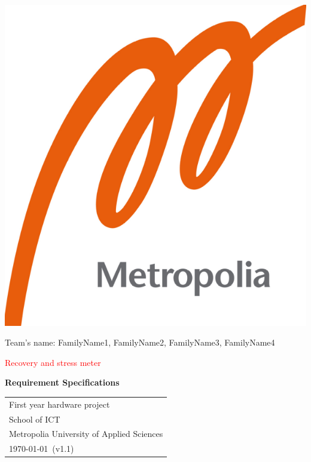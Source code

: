 \documentclass{article}
\begin{document}
\begin{center}
\includegraphics[scale=0.2]{logo.png}
\end{center}

\vspace{0.5cm}

\begin{center}

 Team's name: FamilyName1, FamilyName2, FamilyName3, FamilyName4 \\

\vspace{0.5cm}

{\Huge \textcolor{red}{Recovery and stress meter}} \\


\vspace{0.5cm}

{\Large \textbf{Requirement Specifications}} \\


\end{center}

\vspace{1cm}

\begin{center}

{\Large }



\begin{tabular}{l}
 First year hardware project \\
 School of ICT\\
 Metropolia University of Applied Sciences  \\
 \today \, (v1.1)
\end{tabular}
\end{center}
\end{document}
